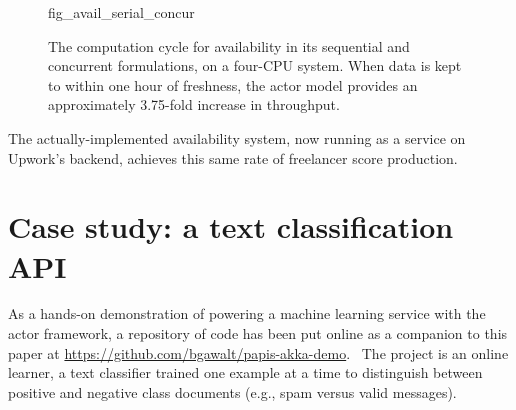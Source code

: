 \documentclass[tablecaption=bottom,wcp]{jmlr}
\begin{document}
\begin{figure}[htbp]
\floatconts
{fig_avail_serial_concur}
{\caption{The computation cycle for availability in its sequential and concurrent
formulations, on a four-CPU system. When data is kept to within one hour of
freshness, the actor model provides an approximately 3.75-fold increase in
throughput.}}
{
}
\end{figure}

The actually-implemented availability system, now running as a service on 
Upwork's backend, achieves this same rate of freelancer score production.

\section{Case study: a text classification API}

As a hands-on demonstration of powering a machine learning service with
the actor framework, a repository of code has been put online as a companion 
to this paper at \url{https://github.com/bgawalt/papis-akka-demo}.~\citep{gawalt_papis_demo}
The project is an online learner, a text classifier trained one example at a time
to distinguish between positive and negative class documents (e.g., spam 
versus valid messages).
\end{document}
